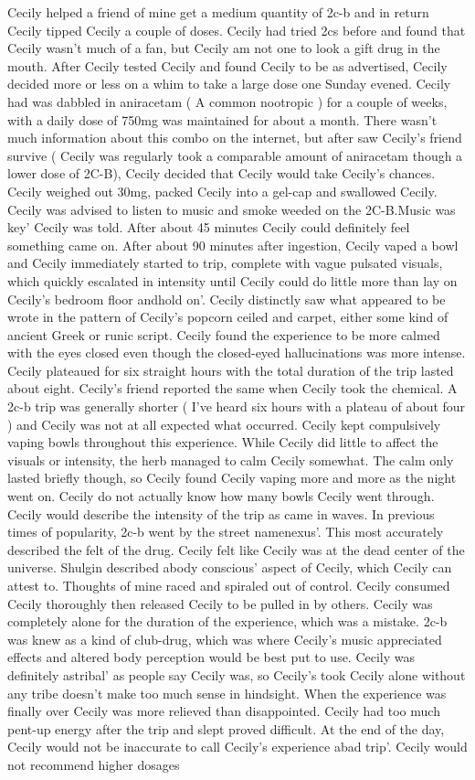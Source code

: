 \documentclass[12pt]{book}
\begin{document}
Cecily helped a friend of mine get a medium quantity of 2c-b and in return Cecily tipped Cecily a couple of doses. Cecily had tried 2cs before and found that Cecily wasn't much of a fan, but Cecily am not one to look a gift drug in the mouth. After Cecily tested Cecily and found Cecily to be as advertised, Cecily decided more or less on a whim to take a large dose one Sunday evened. Cecily had was dabbled in aniracetam ( A common nootropic ) for a couple of weeks, with a daily dose of 750mg was maintained for about a month. There wasn't much information about this combo on the internet, but after saw Cecily's friend survive ( Cecily was regularly took a comparable amount of aniracetam though a lower dose of 2C-B), Cecily decided that Cecily would take Cecily's chances. Cecily weighed out 30mg, packed Cecily into a gel-cap and swallowed Cecily. Cecily was advised to listen to music and smoke weeded on the 2C-B.Music was key' Cecily was told. After about 45 minutes Cecily could definitely feel something came on. After about 90 minutes after ingestion, Cecily vaped a bowl and Cecily immediately started to trip, complete with vague pulsated visuals, which quickly escalated in intensity until Cecily could do little more than lay on Cecily's bedroom floor andhold on'. Cecily distinctly saw what appeared to be wrote in the pattern of Cecily's popcorn ceiled and carpet, either some kind of ancient Greek or runic script. Cecily found the experience to be more calmed with the eyes closed even though the closed-eyed hallucinations was more intense. Cecily plateaued for six straight hours with the total duration of the trip lasted about eight. Cecily's friend reported the same when Cecily took the chemical. A 2c-b trip was generally shorter ( I've heard six hours with a plateau of about four ) and Cecily was not at all expected what occurred. Cecily kept compulsively vaping bowls throughout this experience. While Cecily did little to affect the visuals or intensity, the herb managed to calm Cecily somewhat. The calm only lasted briefly though, so Cecily found Cecily vaping more and more as the night went on. Cecily do not actually know how many bowls Cecily went through. Cecily would describe the intensity of the trip as came in waves. In previous times of popularity, 2c-b went by the street namenexus'. This most accurately described the felt of the drug. Cecily felt like Cecily was at the dead center of the universe. Shulgin described abody conscious' aspect of Cecily, which Cecily can attest to. Thoughts of mine raced and spiraled out of control. Cecily consumed Cecily thoroughly then released Cecily to be pulled in by others. Cecily was completely alone for the duration of the experience, which was a mistake. 2c-b was knew as a kind of club-drug, which was where Cecily's music appreciated effects and altered body perception would be best put to use. Cecily was definitely astribal' as people say Cecily was, so Cecily's took Cecily alone without any tribe doesn't make too much sense in hindsight. When the experience was finally over Cecily was more relieved than disappointed. Cecily had too much pent-up energy after the trip and slept proved difficult. At the end of the day, Cecily would not be inaccurate to call Cecily's experience abad trip'. Cecily would not recommend higher dosages 
\end{document}
